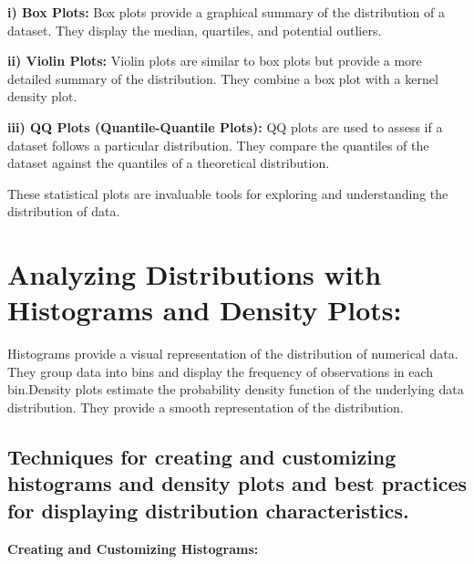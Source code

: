 \documentclass[
]{book}
\newenvironment{Shaded}{\begin{snugshade}}{\end{snugshade}}
\newcommand{\AttributeTok}[1]{\textcolor[rgb]{0.13,0.29,0.53}{#1}}
\newcommand{\CommentTok}[1]{\textcolor[rgb]{0.56,0.35,0.01}{\textit{#1}}}
\newcommand{\FunctionTok}[1]{\textcolor[rgb]{0.13,0.29,0.53}{\textbf{#1}}}
\newcommand{\NormalTok}[1]{#1}
\newcommand{\SpecialCharTok}[1]{\textcolor[rgb]{0.81,0.36,0.00}{\textbf{#1}}}
\newcommand{\StringTok}[1]{\textcolor[rgb]{0.31,0.60,0.02}{#1}}
\begin{document}
\textbf{i) Box Plots:} Box plots provide a graphical summary of the distribution of a dataset. They display the median, quartiles, and potential outliers.

\textbf{ii) Violin Plots:} Violin plots are similar to box plots but provide a more detailed summary of the distribution. They combine a box plot with a kernel density plot.

\textbf{iii) QQ Plots (Quantile-Quantile Plots):} QQ plots are used to assess if a dataset follows a particular distribution. They compare the quantiles of the dataset against the quantiles of a theoretical distribution.

These statistical plots are invaluable tools for exploring and understanding the distribution of data.

\section{Analyzing Distributions with Histograms and Density Plots:}\label{analyzing-distributions-with-histograms-and-density-plots}

Histograms provide a visual representation of the distribution of numerical data. They group data into bins and display the frequency of observations in each bin.Density plots estimate the probability density function of the underlying data distribution. They provide a smooth representation of the distribution.

\subsection{Techniques for creating and customizing histograms and density plots and best practices for displaying distribution characteristics.}\label{techniques-for-creating-and-customizing-histograms-and-density-plots-and-best-practices-for-displaying-distribution-characteristics.}

\textbf{Creating and Customizing Histograms:}

\begin{Shaded}
\end{Shaded}
\end{document}
